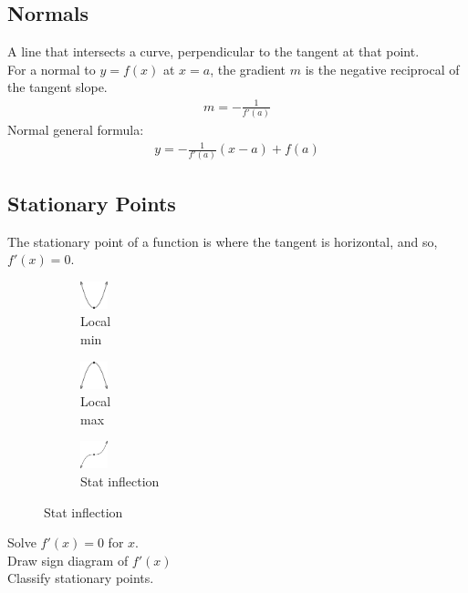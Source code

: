 \documentclass[10pt, a4paper, titlepage]{article}
\begin{document}
\begin{multicols*}{3}
	\dotfill
	\subsection{Normals}
	A line that intersects a curve, perpendicular to the tangent at that point.\\
	For a normal to $y=f(x)$ at $x=a$, the gradient $m$ is the negative reciprocal of the tangent slope.
	\begin{align}
		m=-\frac{1}{f'(a)}
	\end{align}
	Normal general formula:
	\begin{align}
		y=-\frac{1}{f'(a)}(x-a)+f(a)
	\end{align}

	\dotfill
	\subsection{Stationary Points}
	The stationary point of a function is where the tangent is horizontal, and so, $f'(x)=0$.
	\begin{figure}[H]
		\centering
		\begin{subfigure}[b]{0.1\textwidth}
			\centering
			\includegraphics[width=0.8cm]{local_min.png}
			\caption*{Local\\min}
		\end{subfigure}
		\hfill
		\begin{subfigure}[b]{0.1\textwidth}
			\centering
			\includegraphics[width=0.8cm]{local_max.png}
			\caption*{Local\\max}
		\end{subfigure}
		\hfill
		\begin{subfigure}[b]{0.1\textwidth}
			\centering
			\includegraphics[width=0.8cm]{stat_inflection.png}
			\caption*{Stat inflection}
		\end{subfigure}
	\end{figure}
	Solve $f'(x)=0$ for $x$.\\
	Draw sign diagram of $f'(x)$\\
	Classify stationary points.\\


\end{multicols*}
\end{document}
